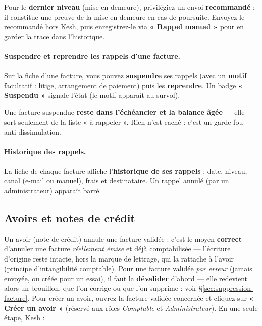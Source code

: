 \documentclass[a4paper,11pt,oneside]{article}
\begin{document}
\begin{keshtip}
Pour le \textbf{dernier niveau} (mise en demeure), privilégiez un envoi \textbf{recommandé} : il constitue une preuve de la mise en demeure en cas de poursuite. Envoyez le recommandé hors Kesh, puis enregistrez-le via \textbf{« Rappel manuel »} pour en garder la trace dans l'historique.
\end{keshtip}

\paragraph{Suspendre et reprendre les rappels d'une facture.} Sur la fiche d'une facture, vous pouvez \textbf{suspendre} ses rappels (avec un \textbf{motif} facultatif : litige, arrangement de paiement) puis les \textbf{reprendre}. Un badge \textbf{« Suspendu »} signale l'état (le motif apparaît au survol).

\begin{keshwarning}
Une facture suspendue \textbf{reste dans l'échéancier et la balance âgée} — elle sort seulement de la liste « à rappeler ». Rien n'est caché : c'est un garde-fou anti-dissimulation.
\end{keshwarning}

\paragraph{Historique des rappels.} La fiche de chaque facture affiche l'\textbf{historique de ses rappels} : date, niveau, canal (e-mail ou manuel), frais et destinataire. Un rappel annulé (par un administrateur) apparaît barré.

\subsection{Avoirs et notes de crédit}
\label{sec:avoirs}

Un avoir (note de crédit) annule une facture validée : c'est le moyen \textbf{correct} d'annuler une facture \emph{réellement émise} et déjà comptabilisée — l'écriture d'origine reste intacte, hors la marque de lettrage, qui la rattache à l'avoir (principe d'intangibilité comptable). Pour une facture validée \emph{par erreur} (jamais envoyée, ou créée pour un essai), il faut la \textbf{dévalider} d'abord --- elle redevient alors un brouillon, que l'on corrige ou que l'on supprime : voir \S\ref{sec:suppression-facture}. Pour créer un avoir, ouvrez la facture validée concernée et cliquez sur \textbf{« Créer un avoir »} (réservé aux rôles \emph{Comptable} et \emph{Administrateur}). En une seule étape, Kesh :
\end{document}
